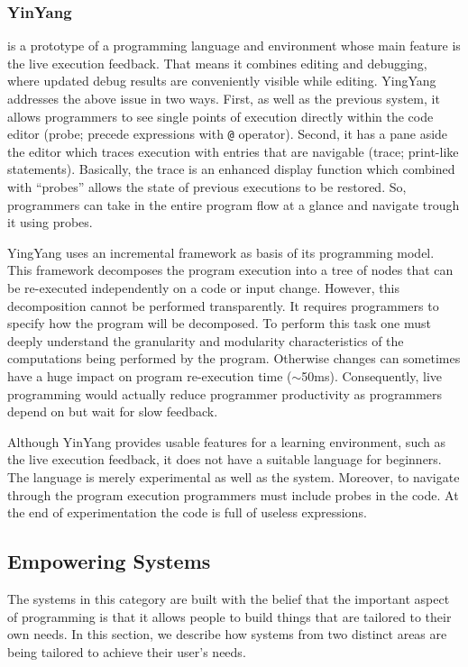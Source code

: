 \subsubsection{YinYang~\cite{mcdirmid2013usable}} is a prototype of a programming language and environment whose main feature is the live execution feedback. That means it combines editing and debugging, where updated debug results are conveniently visible while editing. YingYang addresses the above issue in two ways. First, as well as the previous system, it allows programmers to see single points of execution directly within the code editor (probe; precede expressions with \texttt{@} operator). Second, it has a pane aside the editor which traces execution with entries that are navigable (trace; print-like statements). Basically, the trace is an enhanced display function which combined with ``probes'' allows the state of previous executions to be restored. So, programmers can take in the entire program flow at a glance and navigate trough it using probes.

YingYang uses an incremental framework as basis of its programming model. This framework decomposes the program execution into a tree of nodes that can be re-executed independently on a code or input change. However, this decomposition cannot be performed transparently. It requires programmers to specify how the program will be decomposed. To perform this task one must deeply understand the granularity and modularity characteristics of the computations being performed by the program. Otherwise changes can sometimes have a huge impact on program re-execution time ($\sim$50ms). Consequently, live programming would actually reduce programmer productivity as programmers depend on but wait for slow feedback.

Although YinYang provides usable features for a learning environment, such as the live execution feedback, it does not have a suitable language for beginners. The language is merely experimental as well as the system. Moreover, to navigate through the program execution programmers must include probes in the code. At the end of experimentation the code is full of useless expressions.

\subsection{Empowering Systems}

The systems in this category are built with the belief that the important aspect of programming is that it allows people to build things that are tailored to their own needs. In this section, we describe how systems from two distinct areas are being tailored to achieve their user's needs. 

